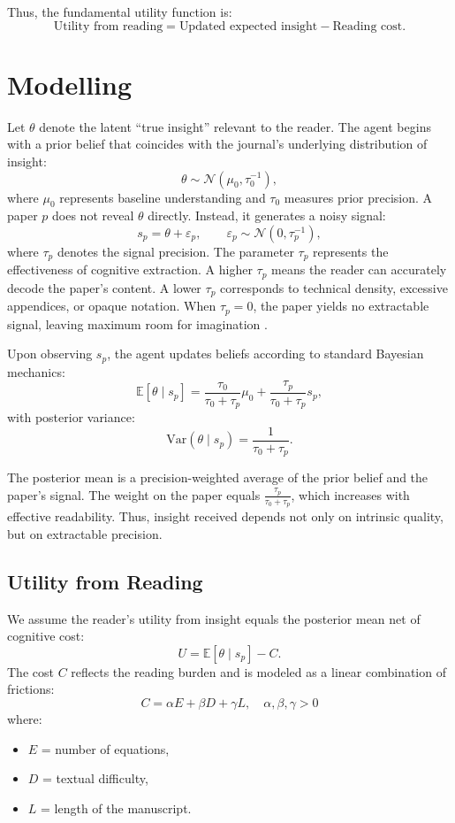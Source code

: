 \documentclass[AER]{AEA}
\begin{document}
Thus, the fundamental utility function is:
\[
\text{Utility from reading}
=
\text{Updated expected insight}
-
\text{Reading cost}.
\]

\section{Modelling}
Let $\theta$ denote the latent “true insight” relevant to the reader. The agent begins with a prior belief that coincides with the journal’s underlying distribution of insight:
\[
\theta \sim \mathcal{N}(\mu_0, \tau_0^{-1}),
\]
where $\mu_0$ represents baseline understanding and $\tau_0$ measures prior precision. A paper $p$ does not reveal $\theta$ directly. Instead, it generates a noisy signal:
\[
s_p = \theta + \varepsilon_p,
\qquad
\varepsilon_p \sim \mathcal{N}(0, \tau_p^{-1}),
\]
where $\tau_p$ denotes the signal precision. The parameter $\tau_p$ represents the effectiveness of cognitive extraction. A higher $\tau_p$ means the reader can accurately decode the paper's content. A lower $\tau_p$ corresponds to technical density, excessive appendices, or opaque notation. When $\tau_p = 0$, the paper yields no extractable signal, leaving maximum room for imagination \citep{NoPaper2026}.

Upon observing $s_p$, the agent updates beliefs according to standard Bayesian mechanics:
\[
\mathbb{E}[\theta \mid s_p]
=
\frac{\tau_0}{\tau_0 + \tau_p}\mu_0
+
\frac{\tau_p}{\tau_0 + \tau_p}s_p,
\]
with posterior variance:
\[
\mathrm{Var}(\theta \mid s_p)
=
\frac{1}{\tau_0 + \tau_p}.
\]

The posterior mean is a precision-weighted average of the prior belief and the paper's signal. The weight on the paper equals $\frac{\tau_p}{\tau_0+\tau_p}$, which increases with effective readability. Thus, insight received depends not only on intrinsic quality, but on extractable precision.

\subsection{Utility from Reading}

We assume the reader's utility from insight equals the posterior mean net of cognitive cost:
\[
U = \mathbb{E}[\theta \mid s_p] - C.
\]
The cost $C$ reflects the reading burden and is modeled as a linear combination of frictions:
\[
C = \alpha E + \beta D + \gamma L, \quad \alpha, \beta, \gamma > 0 
\]
where:
\begin{itemize}
    \item $E$ = number of equations,
    \item $D$ = textual difficulty,
    \item $L$ = length of the manuscript.
\end{itemize}
\end{document}
